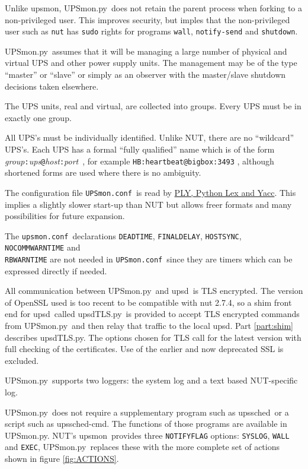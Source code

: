 \documentclass[12pt]{article}
\newcommand{\upsd}{\mbox{\textcolor{UPSDCOLOUR}{upsd}}}
\newcommand{\upsmon}{\mbox{\textcolor{MONCOLOUR}{upsmon}}}
\newcommand{\upssched}{\mbox{\textcolor{SCHEDCOLOUR}{upssched}}}
\newcommand{\upsschedcmd}{\mbox{\textcolor{CMDCOLOUR}{upssched-cmd}}}
\newcommand{\upsdTLS}{\mbox{\textcolor{UPSDCOLOUR}{upsdTLS.py}}}
\newcommand{\UPSmon}{\mbox{\textcolor{UPSMONCOLOUR}{UPSmon.py}}}
\newcommand{\upsmonconf}{\textcolor{MONCOLOUR}{\texttt{upsmon.conf}}}
\newcommand{\UPSmonconf}{\textcolor{UPSMONCOLOUR}{\texttt{UPSmon.conf}}}
\newcommand{\li}{\item}                 %
\begin{document}
\li Unlike \upsmon, \UPSmon\ does not retain the parent process when forking
to a non-privileged user.  This improves security, but imples that the
non-privileged user such as \texttt{nut} has \texttt{sudo} rights for programs
\texttt{wall}, \texttt{notify-send} and \texttt{shutdown}.

\li \UPSmon\ assumes that it will be managing a large number of physical and
virtual UPS and other power supply units.  The management may be of the type
``master'' or ``slave'' or simply as an observer with the master/slave
shutdown decisions taken elsewhere.

\li The UPS units, real and virtual, are collected into groups.  Every UPS
must be in exactly one group.

\li All UPS's must be individually identified.  Unlike NUT, there are no
``wildcard'' UPS's.  Each UPS has a formal ``fully qualified'' name which is
of the form
\textit{group}\texttt{:}\textit{ups}\texttt{@}\textit{host}\texttt{:}\textit{port}\ ,
for example \texttt{HB:heartbeat@bigbox:3493} , although shortened forms are
used where there is no ambiguity.

\li The configuration file \UPSmonconf\ is read by
\href{https://www.dabeaz.com/ply/}{PLY, Python Lex and Yacc}.  This implies
a slightly slower start-up than NUT but allows freer formats and many
possibilities for future expansion.

\li The \upsmonconf\ declarations \texttt{DEADTIME}, \texttt{FINALDELAY},
\texttt{HOSTSYNC}, \texttt{NOCOMMWARNTIME} and \\ \texttt{RBWARNTIME} are not
needed in \UPSmonconf\ since they are timers which can be expressed directly
if needed.

\li All communication between \UPSmon\ and \upsd\ is TLS encrypted. The
version of OpenSSL used is too recent to be compatible with nut 2.7.4, so a
shim front end for \upsd\ called \upsdTLS\ is provided to accept TLS encrypted
commands from \UPSmon\ and then relay that traffic to the local \upsd.  Part
\ref{part:shim} describes \upsdTLS.  The options chosen for TLS call for the
latest version with full checking of the certificates.  Use of the earlier and
now deprecated SSL is excluded.

\li \UPSmon\ supports two loggers: the system log and a text based
NUT-specific log.

\li \UPSmon\ does not require a supplementary program such as \upssched\ or a
script such as \upsschedcmd.  The functions of those programs are available in
\UPSmon.  NUT's \upsmon\ provides three \texttt{NOTIFYFLAG} options:
\texttt{SYSLOG}, \texttt{WALL} and \texttt{EXEC}, \UPSmon\ replaces these with
the more complete set of actions shown in figure \ref{fig:ACTIONS}.
\end{document}
